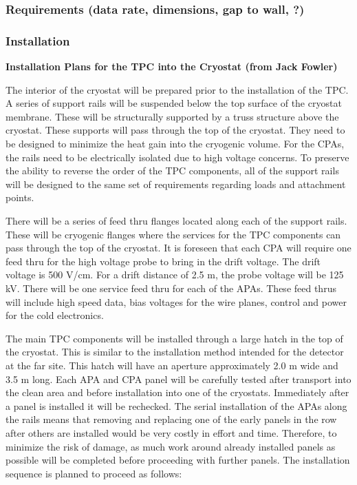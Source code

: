 \subsubsection{Requirements (data rate, dimensions, gap to wall,  ?)}
\subsubsection{Installation}

\textbf{Installation Plans for the TPC into the Cryostat  (from Jack Fowler)}

The interior of the cryostat will be prepared prior to the installation of the TPC.  A series of support rails 
will be suspended below the top surface of the cryostat membrane.  These will be structurally supported 
by a truss structure above the cryostat.  These supports will pass through the top of the cryostat.  They 
need to be designed to minimize the heat gain into the cryogenic volume.  For the CPAs, the rails need to 
be electrically isolated due to high voltage concerns.  To preserve the ability to reverse the order of the 
TPC components, all of the support rails will be designed to the same set of requirements regarding 
loads and attachment points.  

There will be a series of feed thru flanges located along each of the support rails.  These will be cryogenic 
flanges where the services for the TPC components can pass through the top of the cryostat.  It is 
foreseen that each CPA will require one feed thru for the high voltage probe to bring in the drift voltage.  
The drift voltage is 500 V/cm.  For a drift distance of 2.5 m, the probe voltage will be 125 kV.  There will 
be one service feed thru for each of the APAs.  These feed thrus will include high speed data, bias 
voltages for the wire planes, control and power for the cold electronics.  

The main TPC components will be installed through a large hatch in the top of the cryostat.  This is 
similar to the installation method intended for the detector at the far site.  This hatch will have an 
aperture approximately 2.0 m wide and 3.5 m long.  Each APA and CPA panel will be carefully tested after 
transport into the clean area and before installation into one of the cryostats. Immediately after a panel is 
installed it will be rechecked. The serial installation of the APAs along the rails means that removing and 
replacing one of the early panels in the row after others are installed would be very costly in effort and 
time. Therefore, to minimize the risk of damage, as much work around already installed panels as 
possible will be completed before proceeding with further panels.
The installation sequence is planned to proceed as follows:

